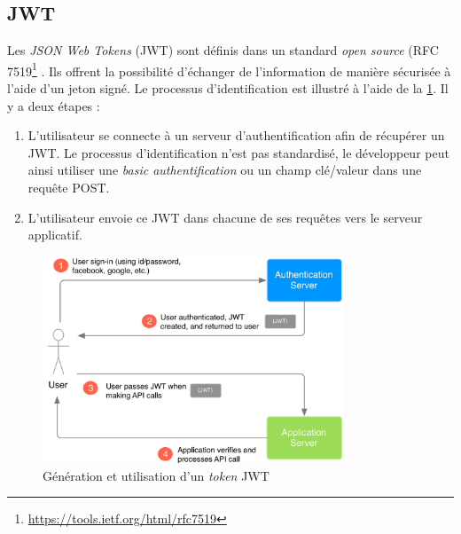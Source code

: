 \subsection{JWT}
\label{sec-security_jwt}

Les \textit{JSON Web Tokens} (JWT) sont définis dans un standard \textit{open source} (RFC 7519\footnote{\url{https://tools.ietf.org/html/rfc7519}} \cite{JSONWebT15:online}. Ils offrent la possibilité d'échanger de l'information de manière sécurisée à l'aide d'un jeton signé. Le processus d'identification est illustré à l'aide de la \cref{fig-jwt_connexion}. Il y a deux étapes : 
\begin{enumerate}
    \item L'utilisateur se connecte à un serveur d'authentification afin de récupérer un JWT. Le processus d'identification n'est pas standardisé, le développeur peut ainsi utiliser une \textit{basic authentification} ou un champ clé/valeur dans une requête POST.
    \item L'utilisateur envoie ce JWT dans chacune de ses requêtes vers le serveur applicatif. \\
\end{enumerate}

\begin{figure}[ht!]
    \centering
    \includegraphics[width=0.8\textwidth]{Figures/Security/jwt_connexion.png}
    \caption{Génération et utilisation d'un \textit{token} JWT}
    \label{fig-jwt_connexion}
\end{figure}

